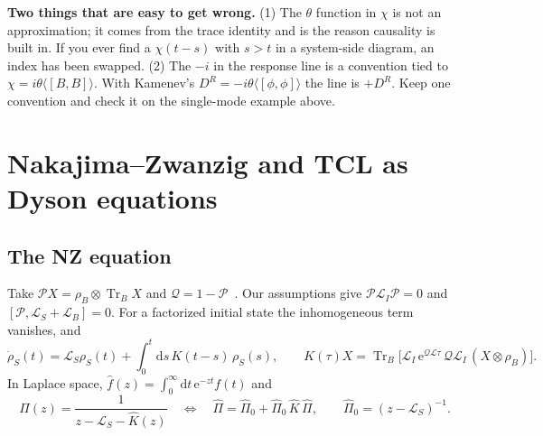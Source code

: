 \documentclass[11pt]{article}
\newcommand{\Tr}{\operatorname{Tr}}
\newcommand{\Lc}{\mathcal{L}}
\newcommand{\Pc}{\mathcal{P}}
\newcommand{\Qc}{\mathcal{Q}}
\newcommand{\ee}{\mathrm{e}}
\newcommand{\dd}{\mathrm{d}}
\newcommand{\rhoB}{\rho_{B}}
\newcommand{\avg}[1]{\langle#1\rangle}
\begin{document}
\begin{warnbox}
\small\textbf{Two things that are easy to get wrong.} (1) The $\theta$ function in $\chi$ is
not an approximation; it comes from the trace identity and is the reason causality is
built in. If you ever find a $\chi(t-s)$ with $s>t$ in a system-side diagram, an index
has been swapped. (2) The $-i$ in the response line is a convention tied to
$\chi=i\theta\avg{[B,B]}$. With Kamenev's $D^R=-i\theta\avg{[\phi,\phi]}$ the line is
$+D^R$. Keep one convention and check it on the single-mode example above.
\end{warnbox}
\section{Nakajima--Zwanzig and TCL as Dyson equations}
\label{sec:nz}

\subsection{The NZ equation}
Take $\Pc X=\rhoB\otimes\Tr_B X$ and $\Qc=1-\Pc$~\cite{Nakajima1958,Zwanzig1960,BreuerPetruccione}.
Our assumptions give $\Pc\Lc_I\Pc=0$ and $[\Pc,\Lc_S+\Lc_B]=0$. For a factorized initial
state the inhomogeneous term vanishes, and
\begin{equation}
  \dot\rho_S(t)=\Lc_S\rho_S(t)+\int_0^t\!\dd s\,K(t-s)\,\rho_S(s),\qquad
  K(\tau)X=\Tr_B\!\big[\Lc_I\,\ee^{\Qc\Lc\tau}\,\Qc\Lc_I\,(X\otimes\rhoB)\big].
  \label{eq:NZ}
\end{equation}
In Laplace space, $\hat f(z)=\int_0^\infty\dd t\,\ee^{-zt}f(t)$ and
\begin{equation}
  \boxed{\;\hat\Pi(z)=\frac{1}{z-\Lc_S-\hat K(z)}
  \quad\Longleftrightarrow\quad
  \hat\Pi=\hat\Pi_0+\hat\Pi_0\,\hat K\,\hat\Pi,\qquad \hat\Pi_0=(z-\Lc_S)^{-1}.\;}
  \label{eq:Dyson}
\end{equation}
\end{document}
